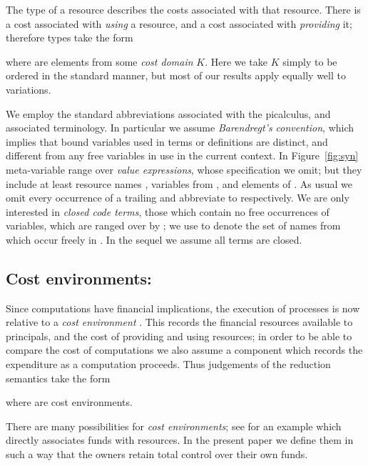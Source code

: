 \documentclass{LMCS}
\newcommand{\Kost}{\ensuremath{K}\xspace}
\begin{document}
The type  of a  resource  describes the costs 
associated with that resource. There is a cost associated with \emph{using}
a resource, and a cost associated with \emph{providing} it; therefore
types take the form

where  are elements from some \emph{cost domain} \Kost.
Here we take \Kost simply to be  ordered in the standard manner, 
but most of our results apply equally well to variations. 



We employ the standard abbreviations associated with the picalculus,
and associated terminology. In particular we assume \emph{Barendregt's
  convention}\label{barendregt}, which implies that bound variables used in terms or
definitions are distinct, and different from any free variables in use
in the current context.  In Figure~\ref{fig:syn} meta-variable 
range over \emph{value expressions}, whose specification we omit; but
they include at least resource names , variables  from
, and elements of . As usual we omit every
occurrence of a trailing  and abbreviate  to  respectively.  We are only interested in
\emph{closed code terms}, those which contain no free occurrences of
variables, which are ranged over by ; we use   
 to denote the set of names from   which occur freely in . 
 In the
sequel we assume all terms are closed.



 
\subsection{Cost environments:}
Since computations have financial implications, the execution of
processes is now relative to a \emph{cost environment} . This
records the financial resources available to principals, and the cost
of providing and using resources; in order to be able to compare the
cost of computations we also assume a component which records the
expenditure as a computation proceeds.
Thus judgements of the reduction semantics take the form

where  are cost environments. 



There are many possibilities for \emph{cost environments}; see \cite{picost} 
for an example which directly associates funds with resources. In the present paper
we define them in such a way that the owners retain total control over their own funds. 
\end{document}
